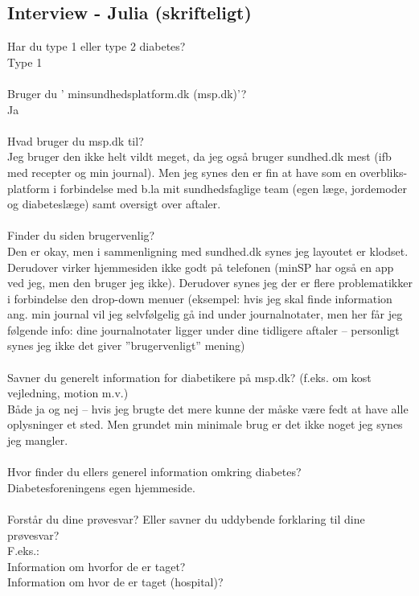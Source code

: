 \subsection{Interview - Julia (skrifteligt)}
Har du type 1 eller type 2 diabetes?\\
Type 1 
\\ \\
Bruger  du ’ minsundhedsplatform.dk (msp.dk)’?\\
Ja   
\\ \\
Hvad bruger du msp.dk til?\\
Jeg bruger den ikke helt vildt meget, da jeg også bruger sundhed.dk mest (ifb med recepter og min journal). Men jeg synes den er fin at have som en overbliks-platform i forbindelse med b.la mit sundhedsfaglige team (egen læge, jordemoder og diabeteslæge) samt oversigt over aftaler.
\\ \\
Finder du siden brugervenlig?\\
Den er okay, men i sammenligning med sundhed.dk synes jeg layoutet er klodset. Derudover virker hjemmesiden ikke godt på telefonen (minSP har også en app ved jeg, men den bruger jeg ikke). Derudover synes jeg der er flere problematikker i forbindelse den drop-down menuer (eksempel: hvis jeg skal finde information ang. min journal vil jeg selvfølgelig gå ind under journalnotater, men her får jeg følgende info: dine journalnotater ligger under  dine tidligere aftaler – personligt synes jeg ikke det giver ”brugervenligt” mening)
\\ \\
Savner du generelt information for diabetikere på msp.dk? (f.eks. om kost vejledning, motion m.v.)\\
Både ja og nej – hvis jeg brugte det mere kunne der måske være fedt at have alle oplysninger et sted. Men grundet min minimale brug er det ikke noget jeg synes jeg mangler.
\\ \\
Hvor finder du ellers generel information omkring diabetes?\\
Diabetesforeningens egen hjemmeside. 
\\ \\
Forstår du dine prøvesvar? Eller savner du uddybende forklaring til dine prøvesvar?\\
             F.eks.:  \\
             Information om hvorfor de er taget?  \\
             Information om hvor de er taget (hospital)?\\
